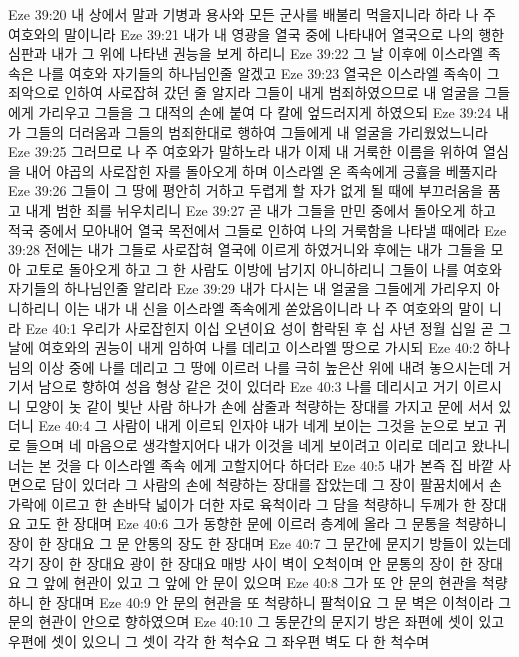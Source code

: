 Eze 39:20  내 상에서 말과 기병과 용사와 모든 군사를 배불리 먹을지니라 하라 나 주 여호와의 말이니라
Eze 39:21  내가 내 영광을 열국 중에 나타내어 열국으로 나의 행한 심판과 내가 그 위에 나타낸 권능을 보게 하리니
Eze 39:22  그 날 이후에 이스라엘 족속은 나를 여호와 자기들의 하나님인줄 알겠고
Eze 39:23  열국은 이스라엘 족속이 그 죄악으로 인하여 사로잡혀 갔던 줄 알지라 그들이 내게 범죄하였으므로 내 얼굴을 그들에게 가리우고 그들을 그 대적의 손에 붙여 다 칼에 엎드러지게 하였으되
Eze 39:24  내가 그들의 더러움과 그들의 범죄한대로 행하여 그들에게 내 얼굴을 가리웠었느니라
Eze 39:25  그러므로 나 주 여호와가 말하노라 내가 이제 내 거룩한 이름을 위하여 열심을 내어 야곱의 사로잡힌 자를 돌아오게 하며 이스라엘 온 족속에게 긍휼을 베풀지라
Eze 39:26  그들이 그 땅에 평안히 거하고 두렵게 할 자가 없게 될 때에 부끄러움을 품고 내게 범한 죄를 뉘우치리니
Eze 39:27  곧 내가 그들을 만민 중에서 돌아오게 하고 적국 중에서 모아내어 열국 목전에서 그들로 인하여 나의 거룩함을 나타낼 때에라
Eze 39:28  전에는 내가 그들로 사로잡혀 열국에 이르게 하였거니와 후에는 내가 그들을 모아 고토로 돌아오게 하고 그 한 사람도 이방에 남기지 아니하리니 그들이 나를 여호와 자기들의 하나님인줄 알리라
Eze 39:29  내가 다시는 내 얼굴을 그들에게 가리우지 아니하리니 이는 내가 내 신을 이스라엘 족속에게 쏟았음이니라 나 주 여호와의 말이 니라
Eze 40:1  우리가 사로잡힌지 이십 오년이요 성이 함락된 후 십 사년 정월 십일 곧 그 날에 여호와의 권능이 내게 임하여 나를 데리고 이스라엘 땅으로 가시되
Eze 40:2  하나님의 이상 중에 나를 데리고 그 땅에 이르러 나를 극히 높은산 위에 내려 놓으시는데 거기서 남으로 향하여 성읍 형상 같은 것이 있더라
Eze 40:3  나를 데리시고 거기 이르시니 모양이 놋 같이 빛난 사람 하나가 손에 삼줄과 척량하는 장대를 가지고 문에 서서 있더니
Eze 40:4  그 사람이 내게 이르되 인자야 내가 네게 보이는 그것을 눈으로 보고 귀로 들으며 네 마음으로 생각할지어다 내가 이것을 네게 보이려고 이리로 데리고 왔나니 너는 본 것을 다 이스라엘 족속 에게 고할지어다 하더라
Eze 40:5  내가 본즉 집 바깥 사면으로 담이 있더라 그 사람의 손에 척량하는 장대를 잡았는데 그 장이 팔꿈치에서 손가락에 이르고 한 손바닥 넓이가 더한 자로 육척이라 그 담을 척량하니 두께가 한 장대요 고도 한 장대며
Eze 40:6  그가 동향한 문에 이르러 층계에 올라 그 문통을 척량하니 장이 한 장대요 그 문 안통의 장도 한 장대며
Eze 40:7  그 문간에 문지기 방들이 있는데 각기 장이 한 장대요 광이 한 장대요 매방 사이 벽이 오척이며 안 문통의 장이 한 장대요 그 앞에 현관이 있고 그 앞에 안 문이 있으며
Eze 40:8  그가 또 안 문의 현관을 척량하니 한 장대며
Eze 40:9  안 문의 현관을 또 척량하니 팔척이요 그 문 벽은 이척이라 그 문의 현관이 안으로 향하였으며
Eze 40:10  그 동문간의 문지기 방은 좌편에 셋이 있고 우편에 셋이 있으니 그 셋이 각각 한 척수요 그 좌우편 벽도 다 한 척수며
